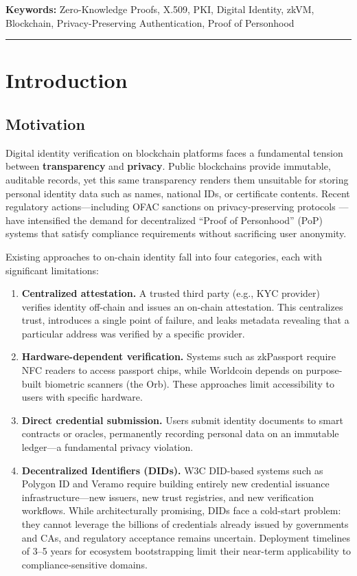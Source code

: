 \documentclass[11pt, a4paper]{article}
\begin{document}
\noindent\textbf{Keywords:} Zero-Knowledge Proofs, X.509, PKI, Digital Identity, zkVM,
Blockchain, Privacy-Preserving Authentication, Proof of Personhood

\vspace{1em}\hrule\vspace{1em}


\section{Introduction}\label{introduction}

\subsection{Motivation}\label{motivation}

Digital identity verification on blockchain platforms faces a
fundamental tension between \textbf{transparency} and \textbf{privacy}.
Public blockchains provide immutable, auditable records, yet this same
transparency renders them unsuitable for storing personal identity data
such as names, national IDs, or certificate contents. Recent regulatory
actions---including OFAC sanctions on privacy-preserving protocols
\cite{ref1}---have intensified the demand for decentralized ``Proof of
Personhood'' (PoP) systems that satisfy compliance requirements without
sacrificing user anonymity.

Existing approaches to on-chain identity fall into four categories,
each with significant limitations:

\begin{enumerate}
\def\labelenumi{\arabic{enumi}.}
\item
  \textbf{Centralized attestation.} A trusted third party (e.g., KYC
  provider) verifies identity off-chain and issues an on-chain
  attestation. This centralizes trust, introduces a single point of
  failure, and leaks metadata revealing that a particular address was
  verified by a specific provider.
\item
  \textbf{Hardware-dependent verification.} Systems such as zkPassport
  \cite{ref2} require NFC readers to access passport chips, while Worldcoin
  \cite{ref3} depends on purpose-built biometric scanners (the Orb). These
  approaches limit accessibility to users with specific hardware.
\item
  \textbf{Direct credential submission.} Users submit identity documents
  to smart contracts or oracles, permanently recording personal data on
  an immutable ledger---a fundamental privacy violation.
\item
  \textbf{Decentralized Identifiers (DIDs).} W3C DID-based systems such
  as Polygon ID and Veramo require building entirely new credential
  issuance infrastructure---new issuers, new trust registries, and new
  verification workflows. While architecturally promising, DIDs face a
  cold-start problem: they cannot leverage the billions of credentials
  already issued by governments and CAs, and regulatory acceptance
  remains uncertain. Deployment timelines of 3--5 years for ecosystem
  bootstrapping limit their near-term applicability to
  compliance-sensitive domains.
\end{enumerate}
\end{document}
